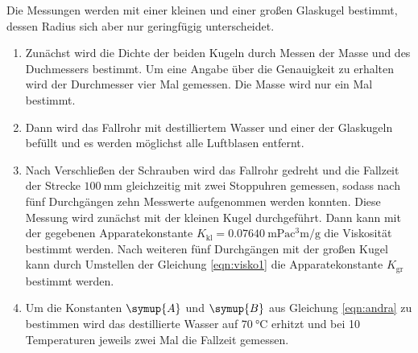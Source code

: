 Die Messungen werden mit einer kleinen und einer großen Glaskugel bestimmt,
dessen Radius sich aber nur geringfügig unterscheidet.
\begin{enumerate}
  \item Zunächst wird die Dichte der beiden Kugeln durch Messen der Masse
  und des Duchmessers bestimmt. Um eine Angabe über die Genauigkeit zu erhalten
  wird der Durchmesser vier Mal gemessen. Die Masse wird nur ein Mal bestimmt.

  \item Dann wird das Fallrohr mit destilliertem Wasser und einer der
  Glaskugeln befüllt und es werden möglichst
  alle Luftblasen entfernt.

  \item Nach Verschließen der Schrauben wird das Fallrohr gedreht und
  die Fallzeit der Strecke $\SI{100}{\milli\meter}$ gleichzeitig mit zwei
  Stoppuhren gemessen, sodass nach fünf Durchgängen zehn Messwerte aufgenommen
  werden konnten. Diese Messung wird zunächst mit der kleinen Kugel durchgeführt.
  Dann kann mit der gegebenen Apparatekonstante $K_{\text{kl}} = \SI{0.07640}
  {\milli\pascal\cubic\centi\meter\per\gram}$ die Viskosität bestimmt werden.
  Nach weiteren fünf Durchgängen mit der großen Kugel
   kann durch Umstellen der Gleichung \eqref{eqn:visko1} die
  Apparatekonstante $K_{\text{gr}}$ bestimmt werden.

  \item Um die Konstanten $\symup{A}$ und $\symup{B}$ aus Gleichung
  \eqref{eqn:andra} zu bestimmen wird das destillierte Wasser auf
  $\SI{70}{\celsius}$ erhitzt und bei 10 Temperaturen jeweils zwei Mal
  die Fallzeit gemessen.


\end{enumerate}

\newpage
